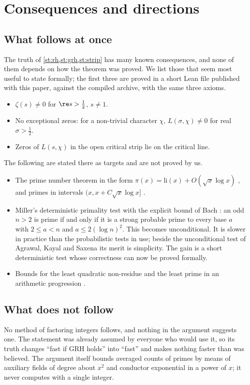 \section{Consequences and directions}\label{sec:directions}

\subsection{What follows at once}
The truth of \cref{st:rh,st:grh,st:strip} has many known consequences, and none of them depends
on how the theorem was proved. We list those that seem most useful to state formally; the
first three are proved in a short Lean file published with this paper, against the compiled
archive, with the same three axioms.
\begin{itemize}
\item $\zeta(s)\ne0$ for $\re s>\tfrac12$, $s\neq1$.
\item No exceptional zeros: for a non-trivial character $\chi$, $L(\sigma,\chi)\neq0$ for real
  $\sigma>\tfrac12$.
\item Zeros of $L(s,\chi)$ in the open critical strip lie on the critical line.
\end{itemize}
The following are stated there as targets and are not proved by us.
\begin{itemize}
\item The prime number theorem in the form $\pi(x)=\mathrm{li}(x)+O(\sqrt x\log x)$
  \cite{vonkoch1901}, and primes in intervals $(x,x+C\sqrt x\log x]$ \cite{cramer1920}.
\item Miller's deterministic primality test \cite{miller1976} with the explicit bound of Bach
  \cite{bach1990}: an odd $n>2$ is prime if and only if it is a strong probable prime to every
  base $a$ with $2\le a<n$ and $a\le2(\log n)^2$. This becomes unconditional. It is slower in practice than the
  probabilistic tests in use; beside the unconditional test of Agrawal, Kayal and Saxena
  \cite{aks2004} its merit is simplicity. The gain is a short deterministic test whose
  correctness can now be proved formally.
\item Bounds for the least quadratic non-residue \cite{ankeny1952} and the least prime in an
  arithmetic progression \cite{bachsorenson1996}.
\end{itemize}

\subsection{What does not follow}
No method of factoring integers follows, and nothing in the argument suggests one. The
statement was already assumed by everyone who would use it, so its truth changes
``fast if GRH holds'' into ``fast'' and makes nothing faster than was believed. The argument
itself bounds averaged counts of primes by means of auxiliary fields of degree about $x^2$ and
conductor exponential in a power of $x$; it never computes with a single integer.

